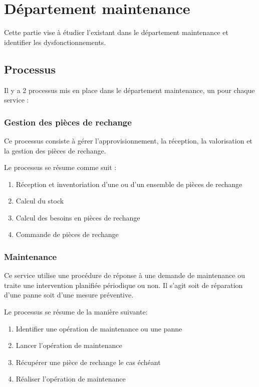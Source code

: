 \section{Département maintenance}

Cette partie vise à étudier l'existant dans le département maintenance et
identifier les dysfonctionnements.

\subsection{Processus}
Il y a 2 processus mis en place dans le département maintenance, un pour 
chaque service :

\subsubsection{Gestion des pièces de rechange}

Ce processus consiste à gérer l'approvisionnement, la réception, la 
valorisation et la gestion des pièces de rechange.

Le processus se résume comme suit :

\begin{enumerate}
\item Réception et inventoriation d'une ou d'un ensemble de pièces de
        rechange
\item Calcul du stock
\item Calcul des besoins en pièces de rechange
\item Commande de pièces de rechange
\end{enumerate}

\subsubsection{Maintenance}
Ce service utilise une procédure de réponse à une demande de maintenance ou
traite une intervention planifiée périodique ou non. Il s'agit soit de 
réparation d'une panne soit d'une mesure préventive.


Le processus se résume de la manière suivante:

\begin{enumerate}
\item Identifier une opération de maintenance ou une panne
\item Lancer l'opération de maintenance
\item Récupérer une pièce de rechange le cas échéant
\item Réaliser l'opération de maintenance
\end{enumerate}

